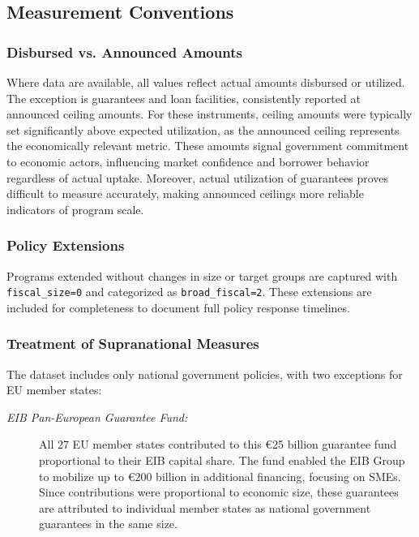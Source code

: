 \documentclass[12pt]{article}
\begin{document}
\subsection{Measurement Conventions}

\subsubsection{Disbursed vs. Announced Amounts}

Where data are available, all values reflect actual amounts disbursed or utilized. The exception is guarantees and loan facilities, consistently reported at announced ceiling amounts. For these instruments, ceiling amounts were typically set significantly above expected utilization, as the announced ceiling represents the economically relevant metric. These amounts signal government commitment to economic actors, influencing market confidence and borrower behavior regardless of actual uptake. Moreover, actual utilization of guarantees proves difficult to measure accurately, making announced ceilings more reliable indicators of program scale.

\subsubsection{Policy Extensions}

Programs extended without changes in size or target groups are captured with \texttt{fiscal\_size=0} and categorized as \texttt{broad\_fiscal=2}. These extensions are included for completeness to document full policy response timelines.

\subsubsection{Treatment of Supranational Measures}

The dataset includes only national government policies, with two exceptions for EU member states:
\begin{description}
  \item[\textit{EIB Pan-European Guarantee Fund:}]
  All 27 EU member states contributed to this €25 billion guarantee fund
  proportional to their EIB capital share. The fund enabled the EIB Group
  to mobilize up to €200 billion in additional financing, focusing on SMEs.
  Since contributions were proportional to economic size, these guarantees
  are attributed to individual member states as national government guarantees in the same size.
\end{description}
\end{document}
